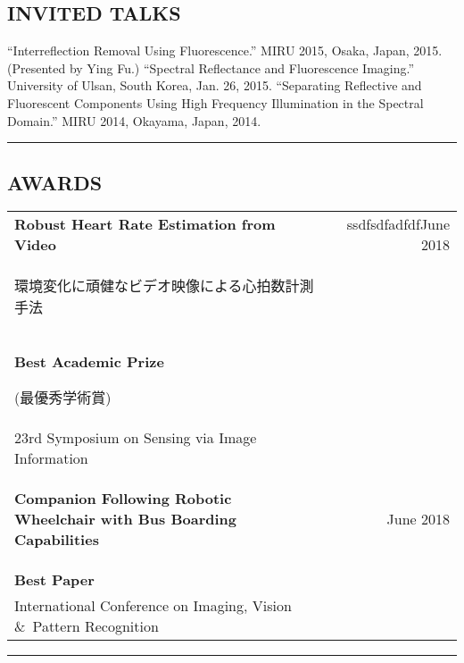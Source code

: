 \documentclass[letterpaper,10pt]{article}
\newcommand{\myline}{ \rule{\textwidth}{0.01in} }
\begin{document}
\subsection*{INVITED TALKS}
``Interreflection Removal Using Fluorescence.''  MIRU 2015, Osaka, Japan,
2015. (Presented by Ying Fu.)\newline
``Spectral Reflectance and Fluorescence Imaging.'' University of Ulsan, South
Korea, Jan. 26, 2015.\newline
``Separating Reflective and Fluorescent Components Using High Frequency Illumination
in the Spectral Domain.'' MIRU 2014, Okayama, Japan, 2014.
\myline
\subsection*{AWARDS}
\begin{tabularx}{\textwidth}{b{}r}
\bfseries{Robust Heart Rate Estimation from Video} & {\textcolor[rgb]{1,1,1}{ssdfsdfadfdf}June 2018} \\
{\begin{CJK}{UTF8}{min}\begin{small}環境変化に頑健なビデオ映像による心拍数計測手法\end{small}\end{CJK}} & {} \\
\textbf{Best Academic Prize} \begin{CJK}{UTF8}{min}(最優秀学術賞)\end{CJK} & {} \\
        {23rd Symposium on Sensing via Image Information} & {} \\ \vspace{0.05in}
\bfseries{\begin{small}\textbf{Companion Following Robotic Wheelchair with Bus Boarding Capabilities}\end{small}} & {June 2018} \\
\textbf{Best Paper}& {} \\
        {International Conference on Imaging, Vision \&\ Pattern Recognition} & {} \vspace{0.05in} \\
\end{tabularx}
\myline
\end{document}
